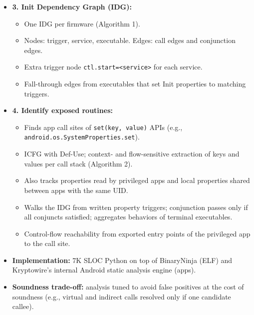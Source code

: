 \documentclass[11pt,a4paper]{article}
\begin{document}
\begin{enumerate}
\begin{itemize}[leftmargin=*, itemsep=1pt, topsep=2pt]
\begin{itemize}[itemsep=0pt]
            \item 116 pattern-matching rules (one to three calls each) for specific behaviors, e.g., sensitive data command followed by a move to external storage.
        \end{itemize}
        \item \textbf{3. Init Dependency Graph (IDG):}
        \begin{itemize}[itemsep=0pt]
            \item One IDG per firmware (Algorithm 1).
            \item Nodes: trigger, service, executable. Edges: call edges and conjunction edges.
            \item Extra trigger node \texttt{ctl.start=<service>} for each service.
            \item Fall-through edges from executables that set Init properties to matching triggers.
        \end{itemize}
        \item \textbf{4. Identify exposed routines:}
        \begin{itemize}[itemsep=0pt]
            \item Finds app call sites of \texttt{set(key, value)} APIs (e.g., \texttt{android.os.SystemProperties.set}).
            \item ICFG with Def-Use; context- and flow-sensitive extraction of keys and values per call stack (Algorithm 2).
            \item Also tracks properties read by privileged apps and local properties shared between apps with the same UID.
            \item Walks the IDG from written property triggers; conjunction passes only if all conjuncts satisfied; aggregates behaviors of terminal executables.
            \item Control-flow reachability from exported entry points of the privileged app to the call site.
        \end{itemize}
        \item \textbf{Implementation:} 7K SLOC Python on top of BinaryNinja (ELF) and Kryptowire's internal Android static analysis engine (apps).
        \item \textbf{Soundness trade-off:} analysis tuned to avoid false positives at the cost of soundness (e.g., virtual and indirect calls resolved only if one candidate callee).
    \end{itemize}


\end{enumerate}
\end{document}
